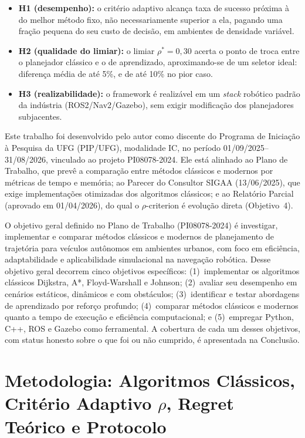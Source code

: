 \documentclass[12pt, a4paper]{article}
\begin{document}
\begin{itemize}
  \item[] \textbf{H1 (desempenho):} o critério adaptivo alcança taxa de sucesso próxima à do
    melhor método fixo, não necessariamente superior a ela, pagando uma fração pequena do seu
    custo de decisão, em ambientes de densidade variável.
  \item[] \textbf{H2 (qualidade do limiar):} o limiar $\rho^*{=}0{,}30$ acerta o ponto de troca
    entre o planejador clássico e o de aprendizado, aproximando-se de um seletor ideal: diferença
    média de até 5\%, e de até 10\% no pior caso.
  \item[] \textbf{H3 (realizabilidade):} o framework é realizável em um \textit{stack} robótico
    padrão da indústria (ROS2/Nav2/Gazebo), sem exigir modificação dos planejadores subjacentes.
\end{itemize}

Este trabalho foi desenvolvido pelo autor como discente do Programa de Iniciação à Pesquisa da
UFG (PIP/UFG), modalidade IC, no período 01/09/2025--31/08/2026, vinculado ao projeto
PI08078-2024. Ele está alinhado ao Plano de Trabalho, que prevê a comparação entre métodos
clássicos e modernos por métricas de tempo e memória; ao Parecer do Consultor SIGAA
(13/06/2025), que exige implementações otimizadas dos algoritmos clássicos; e ao Relatório
Parcial (aprovado em 01/04/2026), do qual o $\rho$-criterion é evolução direta (Objetivo~4).

O objetivo geral definido no Plano de Trabalho (PI08078-2024) é investigar, implementar e
comparar métodos clássicos e modernos de planejamento de trajetória para veículos autônomos em
ambientes urbanos, com foco em eficiência, adaptabilidade e aplicabilidade simulacional na
navegação robótica. Desse objetivo geral decorrem cinco objetivos específicos: (1)~implementar os
algoritmos clássicos Dijkstra, A*, Floyd-Warshall e Johnson; (2)~avaliar seu desempenho em
cenários estáticos, dinâmicos e com obstáculos; (3)~identificar e testar abordagens de
aprendizado por reforço profundo; (4)~comparar métodos clássicos e modernos quanto a tempo de
execução e eficiência computacional; e (5)~empregar Python, C++, ROS e Gazebo como ferramental.
A cobertura de cada um desses objetivos, com status honesto sobre o que foi ou não cumprido, é
apresentada na Conclusão.

\section{Metodologia: Algoritmos Clássicos, Critério Adaptivo \texorpdfstring{$\rho$}{rho}, Regret Teórico e Protocolo}
\label{sec:criterio_adaptivo}
\end{document}
